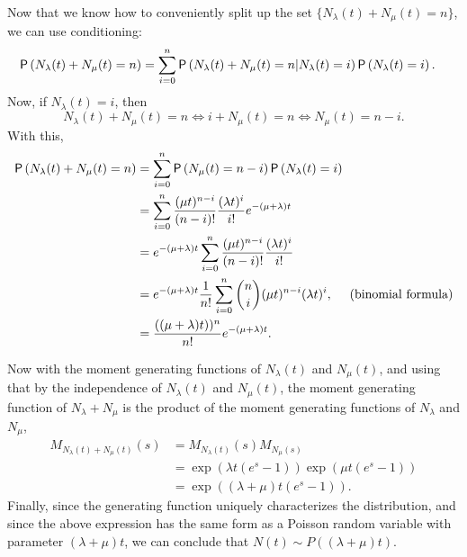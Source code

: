 \begin{exercise}
\begin{solution}
Now that we know how to conveniently split up the set $\{N_\lambda(t) + N_\mu(t) = n\}$,  we can use conditioning: 
  \begin{equation*}
    \begin{split}
\P{N_\lambda(t) + N_\mu(t) = n} 
&= \sum_{i=0}^n \P{N_\lambda(t) + N_\mu(t) = n|N_\lambda(t) = i}\P{N_\lambda(t)=i}.
\end{split}
\end{equation*}
Now, if $N_\lambda(t)=i$, then 
\begin{equation*}
N_\lambda(t)+N_\mu(t) = n \iff 
i+N_\mu(t) = n \iff 
N_\mu(t) = n-i.
\end{equation*}
With this, 
  \begin{align*}\label{eq:002}
\P{N_\lambda(t) + N_\mu(t) = n} 
&= \sum_{i=0}^n \P{ N_\mu(t) = n-i}\P{N_\lambda(t)=i} \\
&= \sum_{i=0}^n \frac{(\mu t)^{n-i}}{(n-i)!} \frac{(\lambda t)^i}{i!} e^{-(\mu+\lambda)t} \\
&= e^{-(\mu+\lambda)t} \sum_{i=0}^n \frac{(\mu t)^{n-i}}{(n-i)!} \frac{(\lambda t)^i}{i!}  \\
&= e^{-(\mu+\lambda)t}\frac 1{n!} \sum_{i=0}^n {n \choose i }(\mu t)^{n-i}(\lambda t)^i, \quad\text{ (binomial formula)}   \\
&= \frac{((\mu+\lambda)t))^n}{n!}e^{-(\mu+\lambda)t}.
  \end{align*}

Now with the moment generating functions of $N_\lambda(t)$ and $N_\mu(t)$, and using that by the independence of  $N_\lambda(t)$ and $N_\mu(t)$, the moment generating function of $N_\lambda + N_\mu$ is the product of the moment generating functions of $N_\lambda$ and $N_\mu$, 
\begin{align*}
M_{N_\lambda(t)+N_\mu(t)}(s) 
&= M_{N_\lambda(t)}(s) M_{N_\mu(s)} \\
&=\exp(\lambda t (e^s -1)) \exp(\mu t(e^s-1)) \\
&= \exp((\lambda + \mu)t (e^s-1)).
\end{align*}
Finally, since  the generating function uniquely characterizes
the distribution, and since the above expression has the same form as a Poisson random variable  with parameter $(\lambda+\mu)t$, we can conclude that $N(t)\sim P((\lambda +\mu) t)$.
    \end{solution}
\end{exercise}

